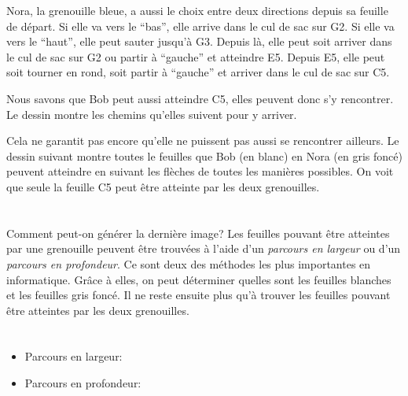 {{Nora, la grenouille bleue, a aussi le choix entre deux directions depuis sa feuille de départ. Si elle va vers le “bas”, elle arrive dans le cul de sac sur G2. Si elle va vers le “haut”, elle peut sauter jusqu’à G3. Depuis là, elle peut soit arriver dans le cul de sac sur G2 ou partir à “gauche” et atteindre E5. Depuis E5, elle peut soit tourner en rond, soit partir à “gauche” et arriver dans le cul de sac sur C5.

Nous savons que Bob peut aussi atteindre C5, elles peuvent donc s’y rencontrer. Le dessin montre les chemins qu’elles suivent pour y arriver.

{\centering%
\par}

Cela ne garantit pas encore qu’elle ne puissent pas aussi se rencontrer ailleurs. Le dessin suivant montre toutes le feuilles que Bob (en blanc) en Nora (en gris foncé) peuvent atteindre en suivant les flèches de toutes les manières possibles. On voit que seule la feuille C5 peut être atteinte par les deux grenouilles.

{\centering%
\par}



\section*{\BrochureItsInformatics}
Comment peut-on générer la dernière image? Les feuilles pouvant être atteintes par une grenouille peuvent être trouvées à l’aide d’un \emph{parcours en largeur} ou d’un \emph{parcours en profondeur}. Ce sont deux des méthodes les plus importantes en informatique. Grâce à elles, on peut déterminer quelles sont les feuilles blanches et les feuilles gris foncé. Il ne reste ensuite plus qu’à trouver les feuilles pouvant être atteintes par les deux grenouilles.



\section*{\BrochureWebsitesAndKeywords}
{\raggedright
\begin{itemize}
  \item Parcours en largeur: \href{https://fr.wikipedia.org/wiki/Algorithme_de_parcours_en_largeur}{}
  \item Parcours en profondeur: \href{https://fr.wikipedia.org/wiki/Algorithme_de_parcours_en_profondeur}{}
\end{itemize}


}}}
